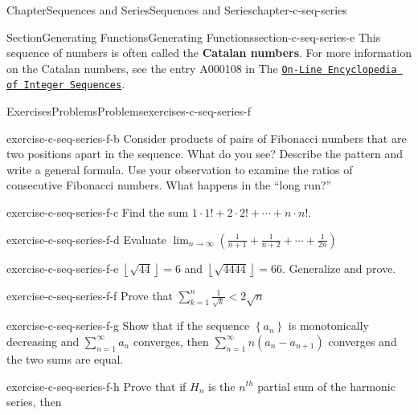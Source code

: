 \documentclass[oneside,10pt,]{book}
\newcommand{\terminology}[1]{\textbf{#1}}
\numberwithin{equation}{section}
\newcommand{\lt}{<}
\begin{document}
\begin{chapterptx}{Chapter}{Sequences and Series}{}{Sequences and Series}{}{}{chapter-c-seq-series}
\begin{sectionptx}{Section}{Generating Functions}{}{Generating Functions}{}{}{section-c-seq-series-e}
This sequence of numbers is often called the \terminology{Catalan numbers}. For more information on the Catalan numbers, see the entry A000108 in The \href{https://oeis.org}{\nolinkurl{On-Line Encyclopedia of Integer Sequences}}.%
\end{sectionptx}
%
%
\typeout{************************************************}
\typeout{************************************************}
%
\begin{exercises-section}{Exercises}{Problems}{}{Problems}{}{}{exercises-c-seq-series-f}
\begin{divisionexercise}{1}{}{}{exercise-c-seq-series-f-b}%
Consider products of pairs of Fibonacci numbers that are two positions apart in the sequence.  What do you see?  Describe the pattern and write a general formula.  Use your observation to examine the ratios of consecutive Fibonacci numbers.   What happens in the  ``long run?''%
\end{divisionexercise}%
\begin{divisionexercise}{2}{}{}{exercise-c-seq-series-f-c}%
Find the sum  \(1\cdot 1! + 2\cdot 2! + \cdots +n\cdot n!\).%
\end{divisionexercise}%
\begin{divisionexercise}{3}{}{}{exercise-c-seq-series-f-d}%
Evaluate  \(\lim_{n\to \infty }  \left(\frac{1}{n+1}+ \frac{1}{n+2}+ \cdots +\frac{1}{2n}\right)\)%
\end{divisionexercise}%
\begin{divisionexercise}{4}{}{}{exercise-c-seq-series-f-e}%
\(\left\lfloor \sqrt{44}\right\rfloor =6\) and   \(\left\lfloor \sqrt{4444}\right\rfloor =66\).  Generalize and prove.%
\end{divisionexercise}%
\begin{divisionexercise}{5}{}{}{exercise-c-seq-series-f-f}%
Prove that \(\sum _{k=1}^n \frac{1}{\sqrt{k}}\lt 2\sqrt{n}\)%
\end{divisionexercise}%
\begin{divisionexercise}{6}{}{}{exercise-c-seq-series-f-g}%
Show that if the sequence \(\left\{a_n\right\}\) is monotonically decreasing and \(\sum _{n=1}^{\infty } a_n\) converges, then \(\sum _{n=1}^{\infty} n \left(a_n-a_{n+1}\right)\) converges and the two sums are equal.%
\end{divisionexercise}%
\begin{divisionexercise}{7}{}{}{exercise-c-seq-series-f-h}%
Prove that if \(H_n\) is the \(n^{th}\) partial sum of the harmonic series, then%
\begin{equation*}

\end{equation*}
\end{divisionexercise}
\end{exercises-section}
\end{chapterptx}
\end{document}
